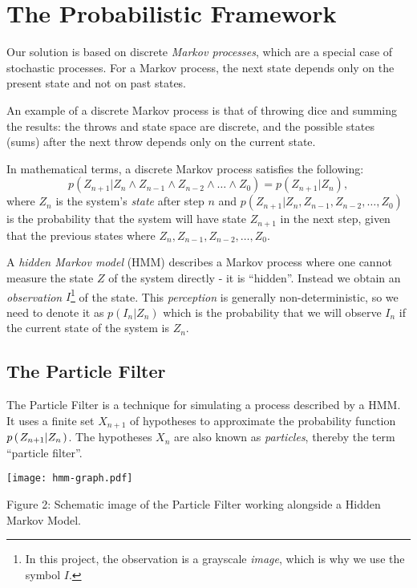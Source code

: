 \section*{The Probabilistic Framework}
Our solution is based on discrete \emph{Markov processes}, which are a special case of stochastic processes. For a Markov process, the next state depends only on the present state and not on past states.

An example of a discrete Markov process is that of throwing dice and summing the results: the throws and state space are discrete, and the possible states (sums) after the next throw depends only on the current state.

In mathematical terms, a discrete Markov process satisfies the following:
\begin{equation}
 p\left(Z_{n+1}|Z_n \wedge Z_{n-1} \wedge Z_{n-2} \wedge \dots \wedge Z_0\right) = p\left(Z_{n+1}|Z_n\right),
\end{equation}
where $Z_n$ is the system's \emph{state} after step $n$ and $p\left(Z_{n+1}|Z_n, Z_{n-1}, Z_{n-2}, \dots, Z_0\right)$ is the probability that the system will have state $Z_{n+1}$ in the next step, given that the previous states where $Z_n, Z_{n-1}, Z_{n-2}, \dots, Z_0$.

A \emph{hidden Markov model} (HMM) describes a Markov process where one cannot measure the state $Z$ of the system directly - it is ``hidden''. Instead we obtain an \emph{observation} $I$\footnote{In this project, the observation is a grayscale \emph{image}, which is why we use the symbol $I$.}  of the state. This \emph{perception} is generally non-deterministic, so we need to denote it as $p(I_n|Z_n)$ which is the probability that we will observe $I_n$ if the current state of the system is $Z_n$.

\subsection*{The Particle Filter}
The Particle Filter is a technique for simulating a process described by a HMM. It uses a finite set $X_{n+1}$ of hypotheses to approximate the probability function $p\left(\left. Z_{n+1} \middle\vert Z_n \right.\right)$. The hypotheses $X_n$ are also known as \emph{particles}, thereby the term ``particle filter''.

\texttt{[image: hmm-graph.pdf]}
\begin{center}
 \label{fig:hmm-graph}
  Figure 2: Schematic image of the Particle Filter working alongside a Hidden Markov Model.
\end{center}

